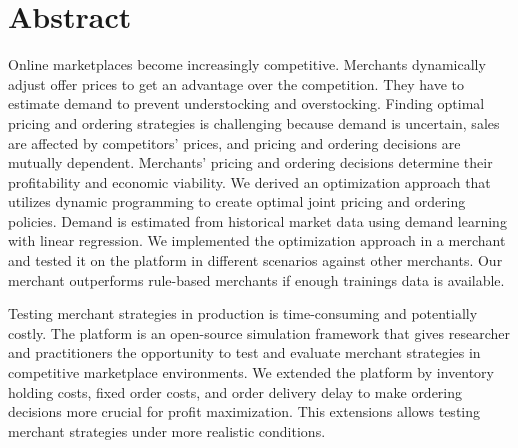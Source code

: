 \chapter*{Abstract}
Online marketplaces become increasingly competitive.
Merchants dynamically adjust offer prices to get an advantage over the competition.
They have to estimate demand to prevent understocking and overstocking.
Finding optimal pricing and ordering strategies is challenging because demand is uncertain, sales are affected by competitors' prices, and pricing and ordering decisions are mutually dependent.
Merchants' pricing and ordering decisions determine their profitability and economic viability.
We derived an optimization approach that utilizes dynamic programming to create optimal joint pricing and ordering policies.
Demand is estimated from historical market data using demand learning with linear regression.
We implemented the optimization approach in a merchant and tested it on the \pricewars platform in different scenarios against other merchants.
Our merchant outperforms rule-based merchants if enough trainings data is available.

Testing merchant strategies in production is time-consuming and potentially costly.
The \pricewars platform is an open-source simulation framework that gives researcher and practitioners the opportunity to test and evaluate merchant strategies in competitive marketplace environments.
We extended the platform by inventory holding costs, fixed order costs, and order delivery delay to make ordering decisions more crucial for profit maximization.
This extensions allows testing merchant strategies under more realistic conditions.


